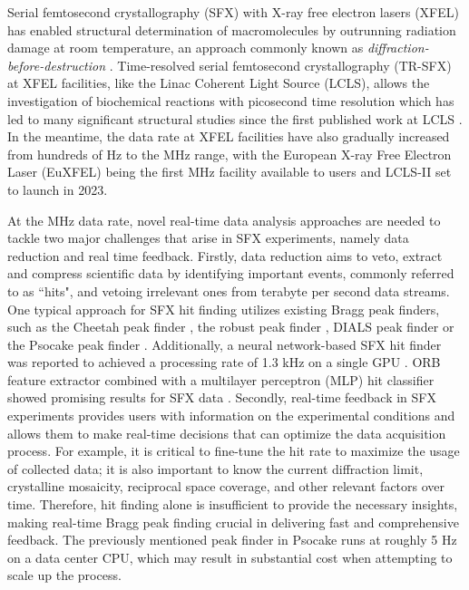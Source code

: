 \documentclass[conference]{IEEEtran}
\newcommand{\psocake}{Psocake}
\begin{document}
Serial femtosecond crystallography (SFX) with X-ray free electron lasers (XFEL) has enabled structural determination of macromolecules by outrunning radiation
damage at room temperature, an approach commonly known as
\textit{diffraction-before-destruction}
\citep{neutzePotentialBiomolecularImaging2000,
chapmanFemtosecondDiffractiveImaging2006,chapmanFemtosecondXrayProtein2011}.
Time-resolved serial femtosecond crystallography (TR-SFX) at XFEL facilities, like the Linac Coherent
Light Source (LCLS), allows the investigation of biochemical reactions with
picosecond time resolution which has led to many significant
structural studies \citep{kupitzSerialTimeresolvedCrystallography2014,
nangoThreedimensionalMovieStructural2016,pandeFemtosecondStructuralDynamics2016a,
youngStructurePhotosystemII2016,sugaLightinducedStructuralChanges2017,
kernStructuresIntermediatesKok2018,ibrahimUntanglingSequenceEvents2020,
sugaTimeresolvedStudiesMetalloproteins2020} since the first published work at
LCLS \citep{aquilaTimeresolvedProteinNanocrystallography2012}.  In the meantime,
the data rate at XFEL facilities have also gradually increased from hundreds of
Hz to the MHz range, with the European X-ray Free Electron Laser (EuXFEL) being
the first MHz facility available to users and LCLS-II set to launch in 2023.

At the MHz data rate, novel real-time data analysis approaches are needed to
tackle two major challenges that arise in SFX experiments, namely data reduction
and real time feedback.  Firstly, data reduction aims to veto, extract and compress scientific data by identifying important events, commonly
referred to as ``hits", and vetoing irrelevant ones from terabyte per second data streams.  One typical approach for SFX hit finding utilizes existing Bragg
peak finders, such as the Cheetah peak finder
\citep{bartyCheetahSoftwareHighthroughput2014}, the robust peak finder
\citep{hadian-jaziPeakfindingAlgorithmBased2017}, DIALS peak finder \citep{Winter2018} or the \psocake{} peak finder
\citep{shinDataAnalysisUsing2018}.  Additionally, a neural network-based SFX
hit finder was reported to achieved a processing rate of 1.3 kHz on a single GPU
\citep{keConvolutionalNeuralNetworkbased2018}. ORB feature extractor combined with a multilayer perceptron (MLP) hit classifier showed promising results for SFX data \citep{rahmaniDataReductionXray2023}.  Secondly, real-time feedback in
SFX experiments provides users with information on the experimental conditions
and allows them to make real-time decisions that can optimize the data
acquisition process.  For example, it is critical to fine-tune the hit rate to
maximize the usage of collected data;  it is also important to know the current
diffraction limit, crystalline mosaicity, reciprocal space coverage, and other
relevant factors over time.  Therefore, hit finding alone is insufficient to
provide the necessary insights, making real-time Bragg peak finding crucial in
delivering fast and comprehensive feedback.  The previously mentioned peak
finder in \psocake{} runs at roughly 5 Hz on a data center CPU, which may result
in substantial cost when attempting to scale up the process.
\end{document}
